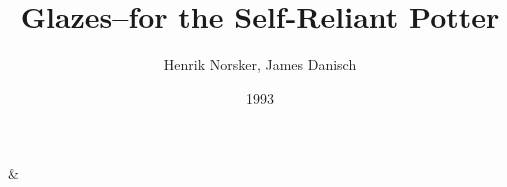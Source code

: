 \documentclass[10pt,a4paper]{book}
\begin{document}
\begin{titlepage}
\title{Glazes--for the Self-Reliant Potter}
\date{1993}
\author{Henrik Norsker, James Danisch}
\maketitle
\end{titlepage}
\tableofcontents

















\begin{appendix}
&
%
%
%
%
%
%
%






%
%
\end{appendix}
\end{document}
